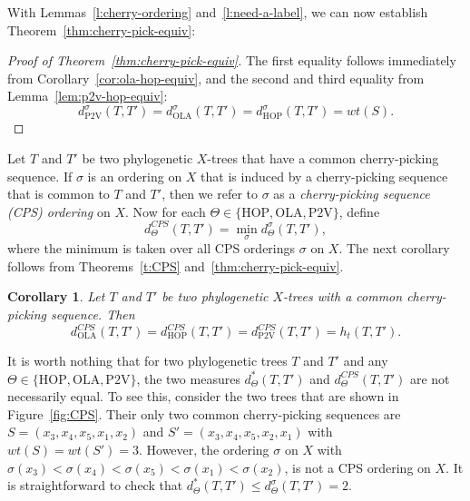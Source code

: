 \documentclass{article}
\newtheorem{cor}{Corollary}
\newcommand{\HOP}{\mathrm{HOP}}
\newcommand{\OLA}{\mathrm{OLA}}
\newcommand{\PV}{\mathrm{P2V}}
\begin{document}
With Lemmas~\ref{l:cherry-ordering} and~\ref{l:need-a-label}, we can now establish Theorem~\ref{thm:cherry-pick-equiv}:

\begin{proof}[Proof of Theorem~\ref{thm:cherry-pick-equiv}] 
The first equality follows immediately from Corollary~\ref{cor:ola-hop-equiv}, and the second and third equality from Lemma~\ref{lem:p2v-hop-equiv}:
    $$
    d_{\PV}^{\sigma}(T,T') = 
    d_{\OLA}^{\sigma}(T,T') = 
    d_{\HOP}^{\sigma}(T,T') = wt(S).
    $$    
\end{proof}

Let $T$ and $T'$ be two phylogenetic $X$-trees that have a common cherry-picking sequence. If $\sigma$ is an ordering on $X$ that is induced by a cherry-picking sequence that is common to $T$ and $T'$, then we refer to $\sigma$ as a {\em cherry-picking sequence (CPS) ordering} on $X$. Now for each $\Theta\in\{\HOP,\OLA,\PV\}$, define
    $$
        d_\Theta^{CPS}(T,T') = \min_{\sigma} d_\Theta^{\sigma}(T,T'), 
    $$
where the minimum is taken over all CPS orderings $\sigma$ on $X$.
The next corollary follows from Theorems~\ref{t:CPS} and~\ref{thm:cherry-pick-equiv}.

\begin{cor}
Let $T$ and $T'$ be two phylogenetic $X$-trees with a common cherry-picking sequence. Then 
    $$
    d_{\OLA}^{CPS}(T,T') = 
    d_{\HOP}^{CPS}(T,T') =
    d_{\PV}^{CPS}(T,T') = h_t(T,T').
    $$
    \label{temporal-tree-child-hybrid}
\end{cor}

It is worth nothing that for two phylogenetic trees $T$ and $T'$ and any $\Theta\in\{\HOP,\OLA,\PV\}$, the two measures $d_\Theta^*(T,T')$ and $d_\Theta^{CPS}(T,T')$ are not necessarily equal. To see this, consider the two trees that are shown in Figure~\ref{fig:CPS}. Their only two common cherry-picking sequences are $S=(x_3,x_4,x_5,x_1,x_2)$ and $S'=(x_3,x_4,x_5,x_2,x_1)$ with $wt(S)=wt(S')=3$. However, the ordering $\sigma$ on $X$ with $\sigma(x_3)<\sigma(x_4)<\sigma(x_5)<\sigma(x_1)<\sigma(x_2)$, is not a CPS ordering on $X$. It is straightforward to check that $d_\Theta^*(T,T')\leq d_\Theta^\sigma(T,T')=2$.
\end{document}
